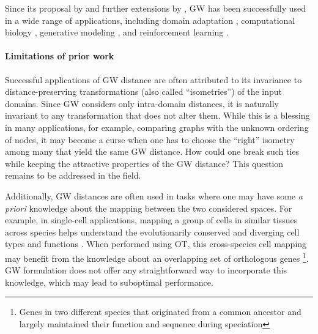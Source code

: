 Since its proposal by \citep{Memoli11} and further extensions by \citep{Peyre16},
GW has been successfully used in a wide range of applications, including
domain adaptation \citep{Yan18}, computational biology
\citep{Nitzan2019,Pamona,UniPort,SpaOTsc,Demetci20,Demetci22,PASTE},
generative modeling \citep{Bunne19}, and reinforcement learning \citep{GW-VAE}.

\paragraph{Limitations of prior work} Successful applications of GW distance are often attributed to its invariance to distance-preserving transformations (also called ``isometries'') of the input domains. Since GW considers only intra-domain distances, it is naturally invariant to any transformation that does not alter them. While this is a blessing in many applications, for example, comparing graphs with the unknown ordering of nodes, it may become a curse when one has to choose the ``right'' isometry among many that yield the same GW distance. How could one break such ties while keeping the attractive properties of the GW distance? This question remains to be addressed in the field.

Additionally, GW distances are often used in tasks where one may have some
\textit{a priori} knowledge about the mapping between the two considered spaces.
For example, in single-cell applications, mapping a group of cells in similar tissues
across species helps understand the evolutionarily conserved and diverging cell types
and functions \citep{kriebel2022uinmf}. When performed using OT, this cross-species cell mapping
may benefit from the knowledge about an overlapping set of orthologous genes
\footnote {Genes in two different species that originated from a common ancestor and
largely maintained their function and sequence during speciation}.
GW formulation does not offer any straightforward way to incorporate this knowledge,
which may lead to suboptimal performance.

